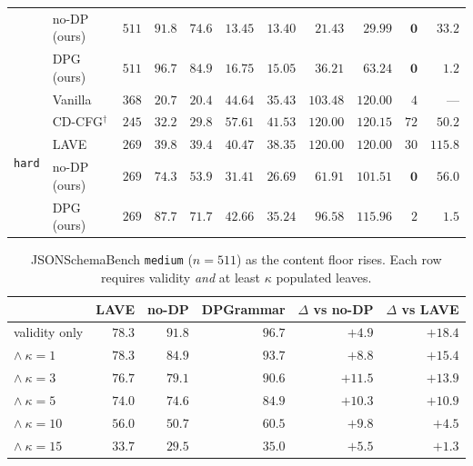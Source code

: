 \documentclass{article}
\begin{document}
\begin{table}[t]
\begin{tabular}{llrrrrrrrrr}
 & no-DP (ours)      & $511$ & $91.8$ & $74.6$ & $\mathbf{13.45}$ & $\mathbf{13.40}$ & $\mathbf{21.43}$ & $\mathbf{29.99}$ & $\mathbf{0}$ & $33.2$ \\
 & DPG (ours)        & $511$ & $\mathbf{96.7}$ & $\mathbf{84.9}$ & $16.75$ & $15.05$ & $36.21$ & $63.24$ & $\mathbf{0}$ & $\mathbf{1.2}$ \\
\midrule
\multirow{5}{*}{\texttt{hard}}
 & Vanilla           & $368$ & $20.7$ & $20.4$ & $44.64$ & $35.43$ & $103.48$ & $120.00$ & $4$ & --- \\
 & CD-CFG$^\dagger$  & $245$ & $32.2$ & $29.8$ & $57.61$ & $41.53$ & $120.00$ & $120.15$ & $72$ & $50.2$ \\
 & LAVE              & $269$ & $39.8$ & $39.4$ & $40.47$ & $38.35$ & $120.00$ & $120.00$ & $30$ & $115.8$ \\
 & no-DP (ours)      & $269$ & $74.3$ & $53.9$ & $\mathbf{31.41}$ & $\mathbf{26.69}$ & $\mathbf{61.91}$ & $\mathbf{101.51}$ & $\mathbf{0}$ & $56.0$ \\
 & DPG (ours)        & $269$ & $\mathbf{87.7}$ & $\mathbf{71.7}$ & $42.66$ & $35.24$ & $96.58$ & $115.96$ & $2$ & $\mathbf{1.5}$ \\
\bottomrule
\end{tabular}
\end{table}

\begin{table}[h]
\centering
\small
\caption{JSONSchemaBench \texttt{medium} ($n{=}511$) as the content floor
rises. Each row requires validity \emph{and} at least $\kappa$ populated leaves.}
\label{tab:main}
\begin{tabular}{lrrrrr}
\toprule
 & LAVE & no-DP & \textbf{DPGrammar} & $\Delta$ vs no-DP & $\Delta$ vs LAVE \\
\midrule
validity only        & $78.3$ & $91.8$ & $\mathbf{96.7}$ & $+4.9$  & $+18.4$ \\
$\wedge\ \kappa{=}1$  & $78.3$ & $84.9$ & $\mathbf{93.7}$ & $+8.8$  & $+15.4$ \\
$\wedge\ \kappa{=}3$  & $76.7$ & $79.1$ & $\mathbf{90.6}$ & $\mathbf{+11.5}$ & $+13.9$ \\
$\wedge\ \kappa{=}5$  & $74.0$ & $74.6$ & $\mathbf{84.9}$ & $+10.3$ & $+10.9$ \\
$\wedge\ \kappa{=}10$ & $56.0$ & $50.7$ & $\mathbf{60.5}$ & $+9.8$  & $+4.5$ \\
$\wedge\ \kappa{=}15$ & $33.7$ & $29.5$ & $\mathbf{35.0}$ & $+5.5$  & $+1.3$ \\
\bottomrule
\end{tabular}
\end{table}
\end{document}
